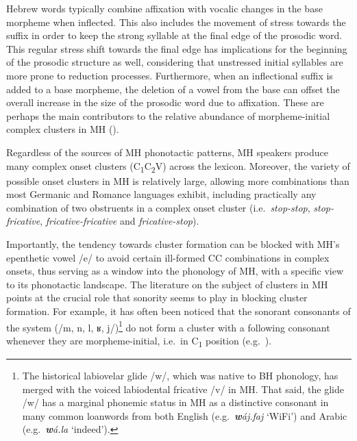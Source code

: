 Hebrew words typically combine affixation with vocalic changes in the base morpheme when inflected. This also includes the movement of stress towards the suffix in order to keep the strong syllable at the final edge of the prosodic word. This regular stress shift towards the final edge has implications for the beginning of the prosodic structure as well, considering that unstressed initial syllables are more prone to reduction processes. Furthermore, when an inflectional suffix is added to a base morpheme, the deletion of a vowel from the base can offset the overall increase in the size of the prosodic word due to affixation. These are perhaps the main contributors to the relative abundance of morpheme-initial complex clusters in MH (\citealt{asherov2019syllablesk, bat2008morphologicallysk}).

Regardless of the sources of MH phonotactic patterns, MH speakers produce many complex onset clusters (C\textsubscript{1}C\textsubscript{2}V) across the lexicon. Moreover, the variety of possible onset clusters in MH is relatively large, allowing more combinations than most Germanic and Romance languages exhibit, including practically any combination of two obstruents in a complex onset cluster (i.e.~\emph{stop-stop}, \emph{stop-fricative}, \emph{fricative-fricative} and \emph{fricative-stop}).

\begin{sloppypar}
Importantly, the tendency towards cluster formation can be blocked with MH's epenthetic vowel /e/ to avoid certain ill-formed CC combinations in complex onsets, thus serving as a window into the phonology of MH, with a specific view to its phonotactic landscape. The literature on the subject of clusters in MH points at the crucial role that sonority seems to play in blocking cluster formation. For example, it has often been noticed that the sonorant consonants of the system (/m, n, l, ʁ, j/)\footnote{The historical labiovelar glide /w/, which was native to BH phonology, has merged with the voiced labiodental fricative /v/ in MH. That said, the glide /w/ has a marginal phonemic status in MH as a distinctive consonant in many common loanwords from both English (e.g.~\emph{\textbf{w}áj.faj} `WiFi') and Arabic (e.g.~\emph{\textbf{w}á.la} `indeed').} do not form a cluster with a following consonant whenever they are morpheme-initial, i.e.~in C\textsubscript{1} position (e.g.~\citealt{rosen1956haivritsk, asherov2019syllablesk, bolozky2006notesk, schwarzwald2005modernsk}).
\end{sloppypar}

